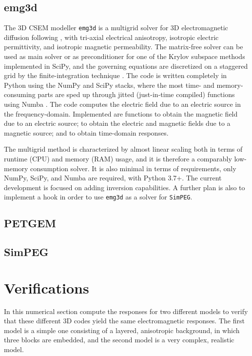 \documentclass[
    paper,
  ]{geophysics}
\newcommand{\emg}[2]{\texttt{emg#1#2}\xspace}
\newcommand{\simpeg}{\texttt{SimPEG}\xspace}
\begin{document}
\subsection{emg3d}

The 3D CSEM modeller \emg3d is a multigrid \citep{CMMP.64.Fedorenko} solver for
3D electromagnetic diffusion following \cite{GP.06.Mulder}, with tri-axial
electrical anisotropy, isotropic electric permittivity, and isotropic magnetic
permeability. The matrix-free solver can be used as main solver or as
preconditioner for one of the Krylov subspace methods implemented in SciPy, and
the governing equations are discretized on a staggered grid by the
finite-integration technique \citep{AEU.77.Weiland}. The code is written
completely in Python using the NumPy and SciPy stacks, where the most time- and
memory-consuming parts are sped up through jitted (just-in-time compiled)
functions using Numba \citep{LLVM.15.Lam}. The code computes the electric field
due to an electric source in the frequency-domain. Implemented are functions to
obtain the magnetic field due to an electric source; to obtain the electric and
magnetic fields due to a magnetic source; and to obtain time-domain responses.

The multigrid method is characterized by almost linear scaling both in terms of
runtime (CPU) and memory (RAM) usage, and it is therefore a comparably
low-memory consumption solver. It is also minimal in terms of requirements,
only NumPy, SciPy, and Numba are required, with Python 3.7+. The current
development is focused on adding inversion capabilities. A further plan is also
to implement a hook in order to use \emg3d as a solver for \simpeg.

\subsection{PETGEM}


\subsection{SimPEG}


\clearpage  %
\section{Verifications}

In this numerical section compute the responses for two different models to
verify that these different 3D codes yield the same electromagnetic responses.
The first model is a simple one consisting of a layered, anisotropic
background, in which three blocks are embedded, and the second model is a very
complex, realistic model.
\end{document}
